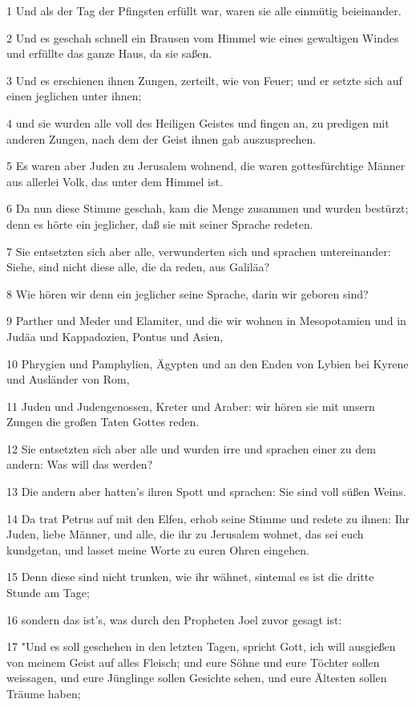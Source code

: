 \par 1 Und als der Tag der Pfingsten erfüllt war, waren sie alle einmütig beieinander.
\par 2 Und es geschah schnell ein Brausen vom Himmel wie eines gewaltigen Windes und erfüllte das ganze Haus, da sie saßen.
\par 3 Und es erschienen ihnen Zungen, zerteilt, wie von Feuer; und er setzte sich auf einen jeglichen unter ihnen;
\par 4 und sie wurden alle voll des Heiligen Geistes und fingen an, zu predigen mit anderen Zungen, nach dem der Geist ihnen gab auszusprechen.
\par 5 Es waren aber Juden zu Jerusalem wohnend, die waren gottesfürchtige Männer aus allerlei Volk, das unter dem Himmel ist.
\par 6 Da nun diese Stimme geschah, kam die Menge zusammen und wurden bestürzt; denn es hörte ein jeglicher, daß sie mit seiner Sprache redeten.
\par 7 Sie entsetzten sich aber alle, verwunderten sich und sprachen untereinander: Siehe, sind nicht diese alle, die da reden, aus Galiläa?
\par 8 Wie hören wir denn ein jeglicher seine Sprache, darin wir geboren sind?
\par 9 Parther und Meder und Elamiter, und die wir wohnen in Mesopotamien und in Judäa und Kappadozien, Pontus und Asien,
\par 10 Phrygien und Pamphylien, Ägypten und an den Enden von Lybien bei Kyrene und Ausländer von Rom,
\par 11 Juden und Judengenossen, Kreter und Araber: wir hören sie mit unsern Zungen die großen Taten Gottes reden.
\par 12 Sie entsetzten sich aber alle und wurden irre und sprachen einer zu dem andern: Was will das werden?
\par 13 Die andern aber hatten's ihren Spott und sprachen: Sie sind voll süßen Weins.
\par 14 Da trat Petrus auf mit den Elfen, erhob seine Stimme und redete zu ihnen: Ihr Juden, liebe Männer, und alle, die ihr zu Jerusalem wohnet, das sei euch kundgetan, und lasset meine Worte zu euren Ohren eingehen.
\par 15 Denn diese sind nicht trunken, wie ihr wähnet, sintemal es ist die dritte Stunde am Tage;
\par 16 sondern das ist's, was durch den Propheten Joel zuvor gesagt ist:
\par 17 "Und es soll geschehen in den letzten Tagen, spricht Gott, ich will ausgießen von meinem Geist auf alles Fleisch; und eure Söhne und eure Töchter sollen weissagen, und eure Jünglinge sollen Gesichte sehen, und eure Ältesten sollen Träume haben;
